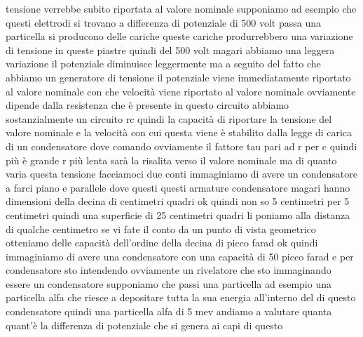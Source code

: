 {tensione verrebbe subito riportata al valore nominale supponiamo ad esempio che questi elettrodi si trovano a differenza di potenziale di 500 volt passa una particella si producono delle cariche queste cariche produrrebbero una variazione di tensione in queste piastre quindi del 500 volt magari abbiamo una leggera variazione il potenziale diminuisce leggermente ma a seguito del fatto che abbiamo un generatore di tensione il potenziale viene immediatamente riportato al valore nominale con che velocità viene riportato al valore nominale ovviamente dipende dalla resistenza che è presente in questo circuito abbiamo sostanzialmente un circuito rc quindi la capacità di riportare la tensione del valore nominale e la velocità con cui questa viene è stabilito dalla legge di carica di un condensatore dove comando ovviamente il fattore tau pari ad r per c quindi più è grande r più lenta sarà la risalita verso il valore nominale ma di quanto varia questa tensione facciamoci due conti immaginiamo di avere un condensatore a farci piano e parallele dove questi questi armature condensatore magari hanno dimensioni della decina di centimetri quadri ok quindi non so 5 centimetri per 5 centimetri quindi una superficie di 25 centimetri quadri li poniamo alla distanza di qualche centimetro se vi fate il conto da un punto di vista geometrico otteniamo delle capacità dell'ordine della decina di picco farad ok quindi immaginiamo di avere una condensatore con una capacità di 50 picco farad e per condensatore sto intendendo ovviamente un rivelatore che sto immaginando essere un condensatore supponiamo che passi una particella ad esempio una particella alfa che riesce a depositare tutta la sua energia all'interno del di questo condensatore quindi una particella alfa di 5 mev andiamo a valutare quanta quant'è la differenza di potenziale che si genera ai capi di questo 

}
